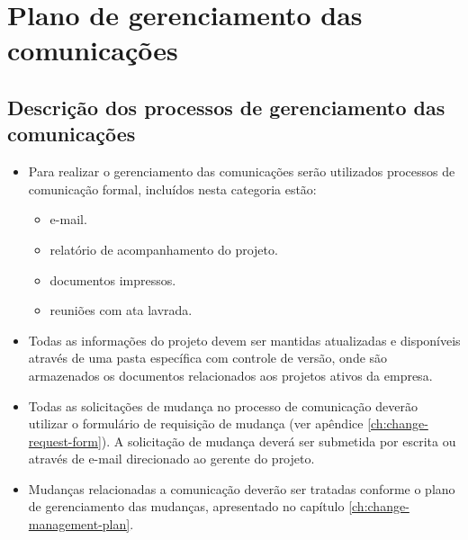 
\chapter{Plano de gerenciamento das comunicações}
\label{ch:communication-management-plan}

\section{Descrição dos processos de gerenciamento das comunicações}


\begin{itemize}
	\item Para realizar o gerenciamento das comunicações serão utilizados processos de comunicação formal, incluídos nesta categoria estão:
	      \begin{itemize}
		      \item e-mail.
		      \item relatório de acompanhamento do projeto.
		      \item documentos impressos.
		      \item reuniões com ata lavrada.
	      \end{itemize}
	\item Todas as informações do projeto devem ser mantidas atualizadas e disponíveis através de uma pasta específica com controle de versão, onde são armazenados os documentos relacionados aos projetos ativos da empresa.
	\item Todas as solicitações de mudança no processo de comunicação deverão utilizar o formulário de requisição de mudança (ver apêndice \ref{ch:change-request-form}). A solicitação de mudança deverá ser submetida por escrita ou através de e-mail direcionado ao gerente do projeto.
	\item Mudanças relacionadas a comunicação deverão ser tratadas conforme o plano de gerenciamento das mudanças, apresentado no capítulo \ref{ch:change-management-plan}.
\end{itemize}

